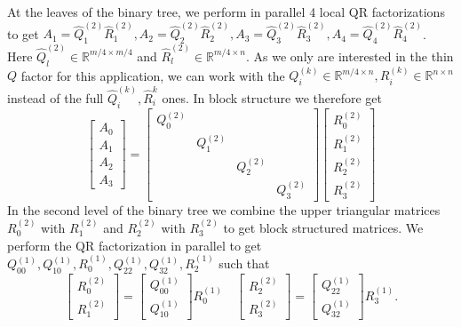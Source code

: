 \documentclass[a4paper, 12pt,oneside]{article}
\begin{document}
		At the leaves of the binary tree, we perform in parallel 4 local QR factorizations to get $A_1=\hat{Q}_1^{(2)} \hat{R}_1^{(2)}, A_2=\hat{Q}_2^{(2)} \hat{R}_2^{(2)}, A_3=\hat{Q}_3^{(2)} \hat{R}_3^{(2)}, A_4=\hat{Q}_4^{(2)} \hat{R}_4^{(2)}$. Here $\hat{Q}_l^{(2)} \in \mathbb{R}^{m / 4 \times m / 4}$ and $\hat{R}_l^{(2)} \in \mathbb{R}^{m / 4 \times n}$. As we only are interested in the thin $Q$ factor for this application, we can work with the $Q_i^{(k)}\in\mathbb R^{m/4\times n}, R_i^{(k)}\in\mathbb R^{n\times n}$ instead of the full $\hat Q_i^{(k)}, \hat R_i^{k}$ ones. In block structure we therefore get
		$$
		\left[\begin{array}{l}
		A_0 \\
		A_1 \\
		A_2 \\
		A_3
		\end{array}\right]=\left[\begin{array}{llll}
		{Q}_0^{(2)} & & & \\
		& {Q}_1^{(2)} & & \\
		& & {Q}_2^{(2)} & \\
		& & & {Q}_3^{(2)}
		\end{array}\right]\left[\begin{array}{l}
		{R}_0^{(2)} \\
		{R}_1^{(2)} \\
		{R}_2^{(2)} \\
		{R}_3^{(2)}
		\end{array}\right]
		$$
		In the second level of the binary tree we combine the upper triangular matrices $R_0^{(2)}$ with $R_1^{(2)}$ and $R_2^{(2)}$ with $R_3^{(2)}$ to get block structured matrices. We perform the QR factorization in parallel to get $Q_{00}^{(1)},Q_{10}^{(1)},R_0^{(1)},Q_{22}^{(1)},Q_{32}^{(1)},R_2^{(1)}$ such that
		$$
		\left[\begin{array}{c}
		R_0^{(2)} \\
		R_1^{(2)}
		\end{array}\right]=\left[\begin{array}{c}
		{Q}_{00}^{(1)} \\
		{Q}_{10}^{(1)} 
		\end{array}\right]
		R_0^{(1)} 
		\quad\left[\begin{array}{c}
		R_2^{(2)} \\
		R_3^{(2)}
		\end{array}\right]=\left[\begin{array}{c}
		{Q}_{22}^{(1)} \\
		{Q}_{32}^{(1)}
		\end{array}\right]
		R_3^{(1)}.
		$$
\end{document}

